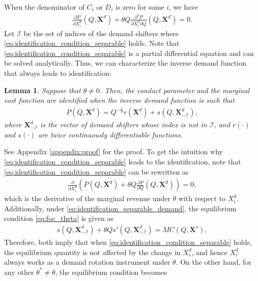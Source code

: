 \documentclass[11pt, a4paper]{article}
\newtheorem{lemma}{Lemma}
\begin{document}
When the denominator of $C_i$ or $D_i$ is zero for some $i$, we have
\begin{align}
    \frac{\partial P}{\partial X^{d}_i}(Q, \bm{X}^{d}) + \theta Q\frac{\partial^2 P}{\partial X^{d}_i\partial Q}(Q, \bm{X}^{d}) = 0. \label{eq:identification_condition_separable}
\end{align}
Let $\mathcal{I}$ be the set of indices of the demand shifters where \eqref{eq:identification_condition_separable} holds.
Note that \eqref{eq:identification_condition_separable} is a partial differential equation and can be solved analytically.
Thus, we can characterize the inverse demand function that always leads to identification:
\begin{lemma}\label{lemma:identification_condition_separable}
    Suppose that $\theta \ne 0$.
    Then, the conduct parameter and the marginal cost function are identified when the inverse demand function is such that
    \begin{align}
        P(Q, \bm{X}^{d}) = Q^{-\frac{1}{\theta}}r(\bm{X}^{d}) + s(Q, \bm{X}^{d}_{-\mathcal{I}}), \label{eq:identification_separable_demand}
    \end{align}
    where $\bm{X}^{d}_{-\mathcal{I}}$ is the vector of demand shifters whose index is not in $\mathcal{I}$, and $r(\cdot)$ and $s(\cdot)$ are twice continuously differentiable functions.
\end{lemma}
See Appendix \ref{appendix:proof} for the proof.
To get the intuition why \eqref{eq:identification_condition_separable} leads to the identification, note that \eqref{eq:identification_condition_separable} can be rewritten as
\begin{align}
    \frac{\partial }{\partial X^{d}_i}\left( P(Q, \bm{X}^{d}) + \theta Q \frac{\partial P}{\partial Q}(Q, \bm{X}^{d})\right) = 0,
\end{align}
which is the derivative of the marginal revenue under $\theta$ with respect to $X^{d}_i$.
Additionally, under \eqref{eq:identification_separable_demand}, the equilibrium condition \eqref{eq:foc_theta} is given as
\begin{align}
    s(Q, \bm{X}^{d}_{-\mathcal{I}}) + \theta Qs'(Q, \bm{X}^{d}_{-\mathcal{I}}) = MC(Q, \bm{X}^{s}),
\end{align}
Therefore, both imply that when \eqref{eq:identification_condition_separable} holds, the equilibrium quantity is not affected by the change in $X^{d}_i$, and hence $X^{d}_i$ always works as a demand rotation instrument under $\theta$.
On the other hand, for any other $\theta^{*} \ne \theta$, the equilibrium condition becomes
\end{document}
